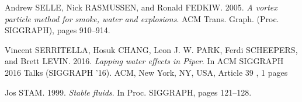 \documentclass[11pt]{article}
\begin{document}
\begin{thebibliography}{2}
Andrew SELLE, Nick RASMUSSEN, and Ronald FEDKIW. 2005.
\textit{A vortex particle method for smoke, water and explosions}.
ACM Trans. Graph. (Proc. SIGGRAPH), pages 910–914.

Vincent SERRITELLA, Hosuk CHANG, Leon J. W. PARK, Ferdi SCHEEPERS, and Brett LEVIN. 2016.
\textit{Lapping water effects in Piper}.
In ACM SIGGRAPH 2016 Talks (SIGGRAPH '16). ACM, New York, NY, USA, Article 39 , 1 pages

Jos STAM. 1999.
\textit{Stable fluids}.
In Proc. SIGGRAPH, pages 121–128.

\end{thebibliography}
\end{document}
